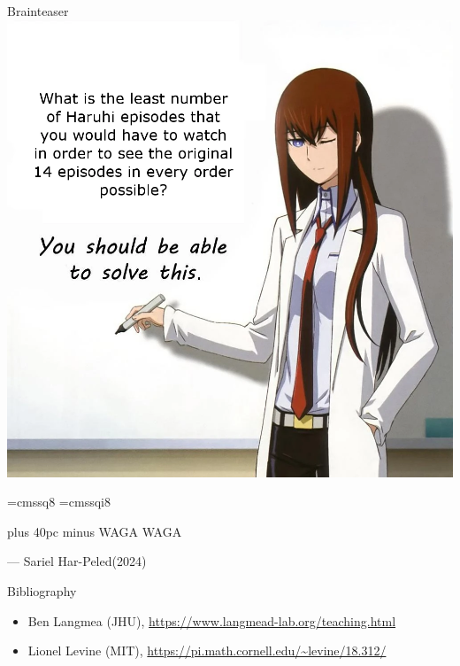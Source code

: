 \documentclass[aspectratio=169, handout]{beamer}
\begin{document}
\begin{frame}{Brainteaser}
	\centering
	\includegraphics[width=\textwidth/2]{haruhi}
\end{frame}

\font\eightss=cmssq8
\font\eightssi=cmssqi8
\newcommand\quoteAuthorDate[3]{\begingroup
	\baselineskip 10pt
	\parfillskip 0pt
	\interlinepenalty 10000 %
	\leftskip 0pt plus 40pc minus \parindent
	\let\rm=\eightss
	\let\sl=\eightssi
	\everypar{\sl}#1\par
	\nobreak\smallskip
	\noindent\rm--- #2\unskip\enspace(#3)\par
	\endgroup}
\begin{frame}
	\begin{center}
		\item \quoteAuthorDate{WAGA WAGA}{Sariel Har-Peled}{\textcolor{sigma@mainblue}{2024}}
	\end{center}
\end{frame}

\begin{frame}[allowframebreaks]{Bibliography}
	
	\begin{itemize}
		\item Ben Langmea (JHU), \url{https://www.langmead-lab.org/teaching.html}
		\item Lionel Levine (MIT), \url{https://pi.math.cornell.edu/~levine/18.312/}
	\end{itemize}
\end{frame}
\end{document}
